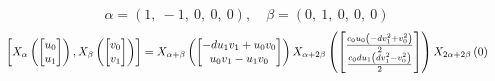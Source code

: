\documentclass[11pt]{article}
\theoremstyle{definition}
\begin{document}
\[
\alpha = \left( 1, \  -1, \  0, \  0, \  0\right), \quad \beta = \left( 0, \  1, \  0, \  0, \  0\right)
\]
\[
\scaletoalign{\textwidth}{\left[ X_{\alpha}\left(\left[\begin{matrix}u_{0}\\u_{1}\end{matrix}\right]\right), X_{\beta}\left(\left[\begin{matrix}v_{0}\\v_{1}\end{matrix}\right]\right) \right] = X_{\alpha + \beta}\left(\left[\begin{matrix}- d u_{1} v_{1} + u_{0} v_{0}\\u_{0} v_{1} - u_{1} v_{0}\end{matrix}\right]\right) X_{\alpha + 2\beta}\left(\left[\begin{matrix}\frac{c_{0} u_{0} \left(- d v_{1}^{2} + v_{0}^{2}\right)}{2}\\\frac{c_{0} d u_{1} \left(d v_{1}^{2} - v_{0}^{2}\right)}{2}\end{matrix}\right]\right) X_{2\alpha + 2\beta}\left(0\right)}
\]
\end{document}
